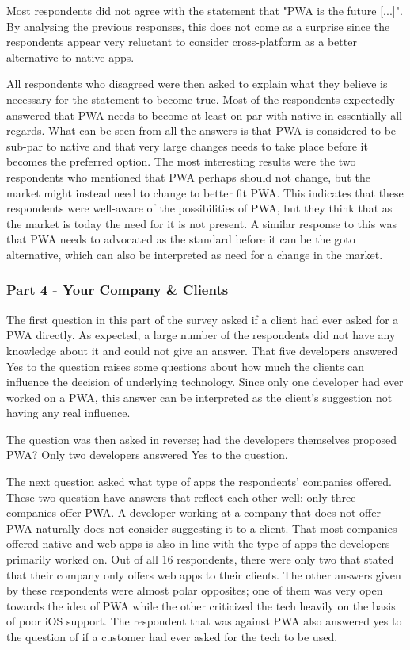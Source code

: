 \documentclass[a4paper,12pt]{article}
\begin{document}
Most respondents did not agree with the statement that "PWA is the future [...]". By analysing the previous responses, this does not come as a surprise since the respondents appear very reluctant to consider cross-platform as a better alternative to native apps.

All respondents who disagreed were then asked to explain what they believe is necessary for the statement to become true. Most of the respondents expectedly answered that PWA needs to become at least on par with native in essentially all regards. What can be seen from all the answers is that PWA is considered to be sub-par to native and that very large changes needs to take place before it becomes the preferred option. The most interesting results were the two respondents who mentioned that PWA perhaps should not change, but the market might instead need to change to better fit PWA. This indicates that these respondents were well-aware of the possibilities of PWA, but they think that as the market is today the need for it is not present. A similar response to this was that PWA needs to advocated as the standard before it can be the goto alternative, which can also be interpreted as need for a change in the market.

\subsubsection{Part 4 - Your Company \& Clients}
\label{Analysis_devSurvey_part4}
The first question in this part of the survey asked if a client had ever asked for a PWA directly. As expected, a large number of the respondents did not have any knowledge about it and could not give an answer. That five developers answered Yes to the question raises some questions about how much the clients can influence the decision of underlying technology. Since only one developer had ever worked on a PWA, this answer can be interpreted as the client's suggestion not having any real influence.

The question was then asked in reverse; had the developers themselves proposed PWA? Only two developers answered Yes to the question.

The next question asked what type of apps the respondents' companies offered. These two question have answers that reflect each other well: only three companies offer PWA. A developer working at a company that does not offer PWA naturally does not consider suggesting it to a client. That most companies offered native and web apps is also in line with the type of apps the developers primarily worked on. Out of all 16 respondents, there were only two that stated that their company only offers web apps to their clients. The other answers given by these respondents were almost polar opposites; one of them was very open towards the idea of PWA while the other criticized the tech heavily on the basis of poor iOS support. The respondent that was against PWA also answered yes to the question of if a customer had ever asked for the tech to be used.
\end{document}
